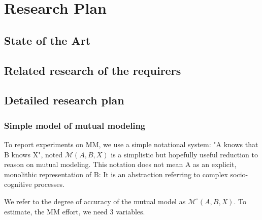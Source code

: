 \documentclass{report}
\begin{document}
\section{Research Plan}

\subsection{State of the Art}

\subsection{Related research of the requirers}

\subsection{Detailed research plan}

\subsubsection{Simple model of mutual modeling}

To report experiments on MM, we use a simple notational system: "A knows that B
knows X", noted $\mathcal{M}(A,B,X)$ is a simplistic but hopefully useful reduction to
reason on mutual modeling. This notation does not mean A as an explicit,
monolithic representation of B: It is an abstraction referring to complex
socio-cognitive processes. 

We refer to the degree of accuracy of the mutual model as
$\mathcal{M}^{\circ}(A,B,X)$. To estimate, the MM effort, we need 3 variables. 
\end{document}
